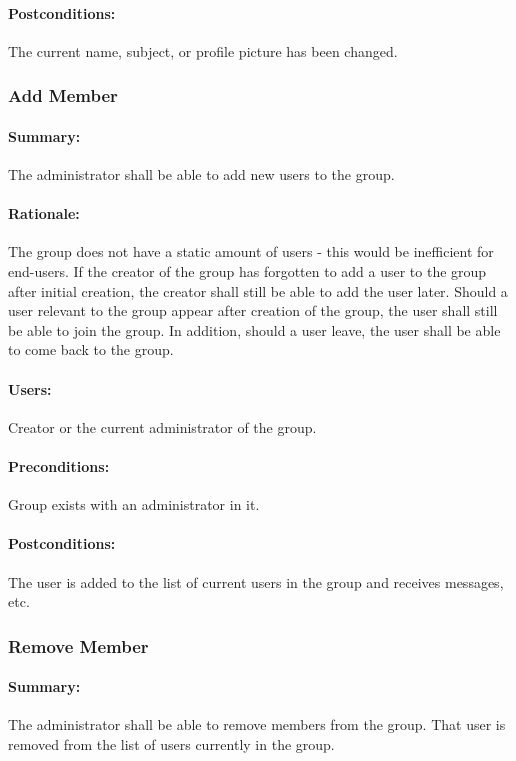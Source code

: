 \documentclass[11pt]{article}
\begin{document}
\paragraph{{Postconditions:}}
The current name, subject, or profile picture has been changed.

\subsubsection{Add Member} \label{UC-add-member}
\paragraph{Summary:}
The administrator shall be able to add new users to the group.
\paragraph{Rationale:}
The group does not have a static amount of users - this would be inefficient for end-users. If the creator of the group has forgotten to add a user to the group after initial creation, the creator shall still be able to add the user later. Should a user relevant to the group appear after creation of the group, the user shall still be able to join the group. In addition, should a user leave, the user shall be able to come back to the group.
\paragraph{Users:}
Creator or the current administrator of the group.
\paragraph{Preconditions:}
Group exists with an administrator in it.
\paragraph{{Postconditions:}}
The user is added to the list of current users in the group and receives messages, etc.

\subsubsection{Remove Member} \label{UC-remove-member}
\paragraph{Summary:}
The administrator shall be able to remove members from  the group. That user is removed from the list of users currently in the group.
\end{document}
